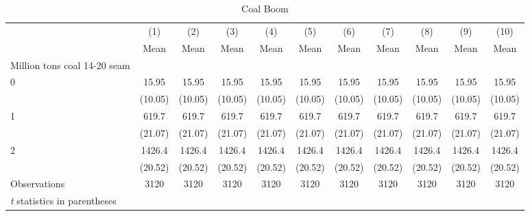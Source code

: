 \begin{table}[htbp]\centering
\caption{Coal Boom}
\begin{tabular}{l*{10}{c}}
\hline\hline
                    &\multicolumn{1}{c}{(1)}&\multicolumn{1}{c}{(2)}&\multicolumn{1}{c}{(3)}&\multicolumn{1}{c}{(4)}&\multicolumn{1}{c}{(5)}&\multicolumn{1}{c}{(6)}&\multicolumn{1}{c}{(7)}&\multicolumn{1}{c}{(8)}&\multicolumn{1}{c}{(9)}&\multicolumn{1}{c}{(10)}\\
                    &\multicolumn{1}{c}{Mean}&\multicolumn{1}{c}{Mean}&\multicolumn{1}{c}{Mean}&\multicolumn{1}{c}{Mean}&\multicolumn{1}{c}{Mean}&\multicolumn{1}{c}{Mean}&\multicolumn{1}{c}{Mean}&\multicolumn{1}{c}{Mean}&\multicolumn{1}{c}{Mean}&\multicolumn{1}{c}{Mean}\\
\hline
Million tons coal 14-20 seam&            &            &            &            &            &            &            &            &            &            \\
0                   &       15.95&       15.95&       15.95&       15.95&       15.95&       15.95&       15.95&       15.95&       15.95&       15.95\\
                    &     (10.05)&     (10.05)&     (10.05)&     (10.05)&     (10.05)&     (10.05)&     (10.05)&     (10.05)&     (10.05)&     (10.05)\\
[1em]
1                   &       619.7&       619.7&       619.7&       619.7&       619.7&       619.7&       619.7&       619.7&       619.7&       619.7\\
                    &     (21.07)&     (21.07)&     (21.07)&     (21.07)&     (21.07)&     (21.07)&     (21.07)&     (21.07)&     (21.07)&     (21.07)\\
[1em]
2                   &      1426.4&      1426.4&      1426.4&      1426.4&      1426.4&      1426.4&      1426.4&      1426.4&      1426.4&      1426.4\\
                    &     (20.52)&     (20.52)&     (20.52)&     (20.52)&     (20.52)&     (20.52)&     (20.52)&     (20.52)&     (20.52)&     (20.52)\\
\hline
Observations        &        3120&        3120&        3120&        3120&        3120&        3120&        3120&        3120&        3120&        3120\\
\hline\hline
\multicolumn{11}{l}{\footnotesize \textit{t} statistics in parentheses}\\
\end{tabular}
\end{table}
